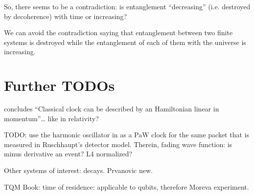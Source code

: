So, there seems to be a contradiction: is entanglement ``decreasing''
(i.e. destroyed by decoherence) with time
or increasing?

We can avoid the contradiction saying that
entanglement between two finite systems is
destroyed while the entanglement of each of them with the universe
is increasing.

\fi

\iftodo
\section{Further TODOs}

\cite{HarmonicClocks} concludes ``Classical clock can be described by an Hamiltonian linear in momentum''\dots
like in relativity?

TODO: use the harmonic oscillator in \cite{HarmonicClocks}
as a PaW clock for the same packet that is measured in
Ruschhaupt's detector model.
Therein, fading wave function: is minus derivative an event?
L4 normalized?

Other systems of interest: decays. Prvanovic new.

TQM Book: time of residence: applicable to qubits, therefore Moreva experiment.
\fi

